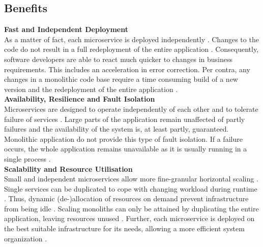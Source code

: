 \FloatBarrier

\subsection{Benefits}
\textbf{Fast and Independent Deployment} \\
As a matter of fact, each microservice is deployed independently \cite{interfaceAnalysisBaresi}. Changes to the code do not result in a full redeployment of the entire application \cite{FunctionalDecompositionHeinrich}. Consequently, software developers are able to react much quicker to changes in business requirements. This includes an acceleration in error correction. Per contra, any changes in a monolithic code base require a time consuming build of a new version and the redeployment of the entire application \cite{Fowler}. \\

\noindent
\textbf{Availability, Resilience and Fault Isolation} \\
Microservices are designed to operate independently of each other and to tolerate failure of services \cite{Fowler}. Large parts of the application remain unaffected of partly failures and the availability of the system is, at least partly, guaranteed. Monolithic application do not provide this type of fault isolation. If a failure occurs, the whole application remains unavailable as it is usually running in a single process \cite{ExtractionMazlami}. \\
 
\noindent
\textbf{Scalability and Resource Utilisation} \\
Small and independent microservices allow more fine-granular horizontal scaling \cite{WorkloadbasedClustering}. Single services can be duplicated to cope with changing workload during runtime \cite{DataflowDrivenChen}. Thus, dynamic (de-)allocation of resources on demand prevent infrastructure from being idle \cite{HeuristicsAlwis}. Scaling monoliths can only be attained by duplicating the entire application, leaving resources unused \cite{ClassificationOfRefactoring}. Further, each microservice is deployed on the best suitable infrastructure for its needs, allowing a more efficient system organization \cite{infoq}. \\


